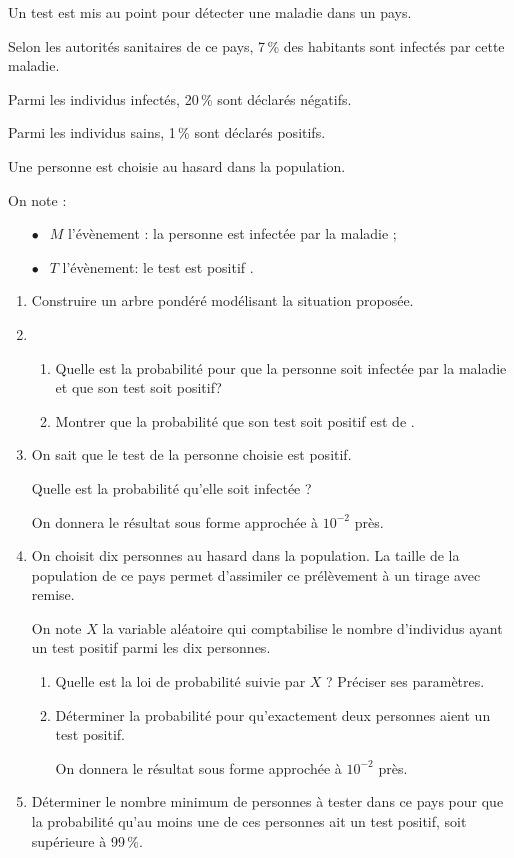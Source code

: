 \documentclass[11pt]{article}
\begin{document}
Un test est mis au point pour détecter une maladie dans un pays.

Selon les autorités sanitaires de ce pays, 7\,\% des habitants sont infectés par cette maladie. 

Parmi les individus infectés, 20\,\% sont déclarés négatifs.

Parmi les individus sains, 1\,\% sont déclarés positifs.

Une personne est choisie au hasard dans la population.

On note :

\setlength\parindent{9mm}
\begin{itemize}
\item[$\bullet~~$]$M$ l'évènement : \og la personne est infectée par la maladie\fg{} ;
\item[$\bullet~~$]$T$ l'évènement: \og le test est positif \fg.
\end{itemize}
\setlength\parindent{0mm}

\medskip

\begin{enumerate}
\item Construire un arbre pondéré modélisant la situation proposée.
\item 
	\begin{enumerate}
		\item Quelle est la probabilité pour que la personne soit infectée par la maladie et que son test soit positif?
		\item Montrer que la probabilité que son test soit positif est de .
	\end{enumerate}
\item On sait que le test de la personne choisie est positif. 

Quelle est la probabilité qu'elle soit infectée ?

On donnera le résultat sous forme approchée à $10^{-2}$ près.
\item On choisit dix personnes au hasard dans la population. La taille de la population de ce pays permet d'assimiler ce prélèvement à un tirage avec remise.

On note $X$ la variable aléatoire qui comptabilise le nombre d'individus ayant un test positif parmi les dix personnes.
	\begin{enumerate}
		\item Quelle est la loi de probabilité suivie par $X$ ? Préciser ses paramètres.
		\item Déterminer la probabilité pour qu'exactement deux personnes aient un test positif.

On donnera le résultat sous forme approchée à $10^{-2}$ près.
	\end{enumerate}
\item Déterminer le nombre minimum de personnes à tester dans ce pays pour que la probabilité qu'au moins une de ces personnes ait un test positif, soit supérieure à 99\,\%.
\end{enumerate}
\end{document}
